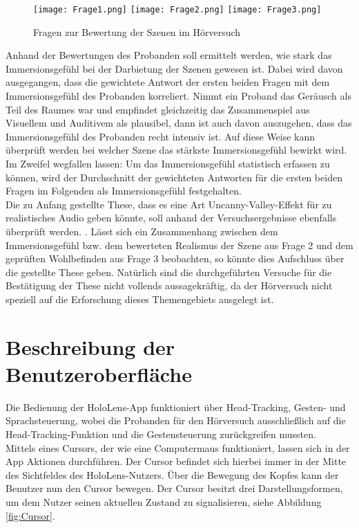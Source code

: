  \begin{figure}[H]
\centering
\texttt{[image: Frage1.png]}
\texttt{[image: Frage2.png]}
\texttt{[image: Frage3.png]}
\caption{Fragen zur Bewertung der Szenen im Hörversuch}
\label{fig:Fragen}
\end{figure} 

Anhand der Bewertungen des Probanden soll ermittelt werden, wie stark das Immersionsgefühl bei der Darbietung der Szenen gewesen ist. Dabei wird davon ausgegangen, dass die gewichtete Antwort der ersten beiden Fragen mit dem Immersionsgefühl des Probanden korreliert. Nimmt ein Proband das Geräusch als Teil des Raumes war und empfindet gleichzeitig das Zusammenspiel aus Visuellem und Auditivem als plausibel, dann ist auch davon auszugehen, dass das Immersionsgefühl des Probanden recht intensiv ist. Auf diese Weise kann überprüft werden bei welcher Szene das stärkste Immersionsgefühl bewirkt wird. \\ 

Im Zweifel wegfallen lassen: Um das Immersionsgefühl statistisch erfassen zu können, wird der Durchschnitt der gewichteten Antworten für die ersten beiden Fragen im Folgenden als Immersionsgefühl festgehalten. \\

Die zu Anfang gestellte These, dass es eine Art Uncanny-Valley-Effekt für zu realistisches Audio geben könnte, soll anhand der Versuchsergebnisse ebenfalls überprüft werden. . Lässt sich ein Zusammenhang zwischen dem Immersionsgefühl bzw. dem bewerteten Realismus der Szene aus Frage 2 und dem geprüften Wohlbefinden aus Frage 3 beobachten, so könnte dies Aufschluss über die gestellte These geben. Natürlich sind die durchgeführten Versuche für die Bestätigung der These nicht vollends aussagekräftig, da der Hörversuch nicht speziell auf die Erforschung dieses Themengebiets ausgelegt ist. 


 
 \section{Beschreibung der Benutzeroberfläche}
 Die Bedienung der HoloLens-App funktioniert über Head-Tracking, Gesten- und Sprachsteuerung, wobei die Probanden für den Hörversuch ausschließlich auf die Head-Tracking-Funktion und die Gestensteuerung zurückgreifen mussten. \\
 
 Mittels eines Cursors, der wie eine Computermaus funktioniert, lassen sich in der App Aktionen durchführen. Der Cursor befindet sich hierbei immer in der Mitte des Sichtfeldes des HoloLens-Nutzers. Über die Bewegung des Kopfes kann der Benutzer nun den Cursor bewegen. Der Cursor besitzt drei Darstellungsformen, um dem Nutzer seinen aktuellen Zustand zu signalisieren, siehe Abbildung \ref{fig:Cursor}. 
 
